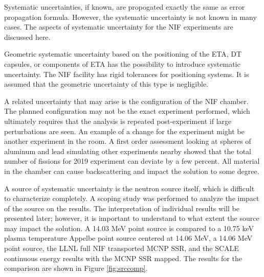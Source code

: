 {{Systematic uncertainties, if known, are propogated exactly the same as error propagation formula. 
However, the systematic uncertainty is not known in many cases. 
The aspects of systematic uncertainty for the NIF experiments are discussed here. 

Geometric systematic uncertainty based on the positioning of the ETA, DT capsules, or components of ETA has the possibility to introduce systematic uncertainty. 
The NIF facility has rigid tolerances for positioning systems. 
It is assumed that the geometric uncertainty of this type is negligible.

A related uncertainty that may arise is the configuration of the NIF chamber. 
The planned configuration may not be the exact experiment performed, which ultimately requires that the analysis is repeated post-experiment if large perturbations are seen. 
An example of a change for the experiment might be another experiment in the room. 
A first order assessment looking at spheres of aluminum and lead simulating other experiments nearby showed that the total number of fissions for 2019 experiment can deviate by a few percent. 
All material in the chamber can cause backscattering and impact the solution to some degree. 

A source of systematic uncertainty is the neutron source itself, which is difficult to characterize completely. 
A scoping study was performed to analyze the impact of the source on the results. 
The interpretation of individual results will be presented later; however, it is important to understand to what extent the source may impact the solution. 
A 14.03 MeV point source is compared to a 10.75 keV plasma temperature Appelbe point source centered at 14.06 MeV, a 14.06 MeV  point source, the LLNL full NIF transported MCNP SSR, and the SCALE continuous energy results with the MCNP SSR mapped. 
The results for the comparison are shown in Figure \ref{fig:srccomp}. 

}}
